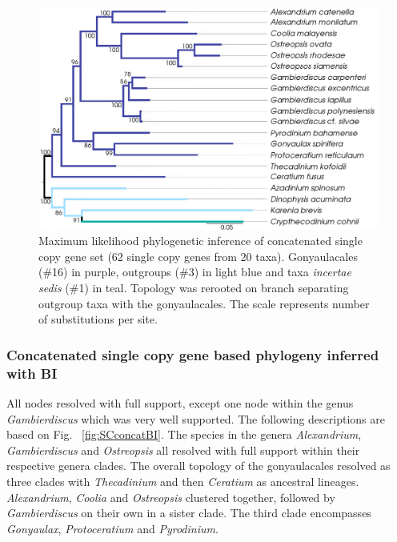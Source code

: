 \documentclass[12pt]{article}
\begin{document}
\begin{figure} 
\includegraphics[scale=.45]{figures/SC-concat-ML_WAG.png} 
\caption{Maximum likelihood phylogenetic inference of concatenated single copy gene set (62 single copy genes from 20 taxa). Gonyaulacales (\#16) in purple, outgroups (\#3) in light blue and taxa \textit{incertae sedis} (\#1) in teal. Topology was rerooted on branch separating outgroup taxa with the gonyaulacales. The scale represents number of substitutions per site.} 
\label{fig:SCconcatML}
\end{figure} 
\FloatBarrier

\subsubsection*{Concatenated single copy gene based phylogeny inferred with BI}
\FloatBarrier 
All nodes resolved with full support, except one node within the genus \textit{Gambierdiscus} which was very well supported. 
The following descriptions are based on Fig. ~\ref{fig:SCconcatBI}. 
The species in the genera \textit{Alexandrium}, \textit{Gambierdiscus} and \textit{Ostreopsis} all resolved with full support within their respective genera clades. 
The overall topology of the gonyaulacales resolved as three clades with \textit{Thecadinium} and then \textit{Ceratium} as ancestral lineages. 
\textit{Alexandrium}, \textit{Coolia} and \textit{Ostreopsis} clustered together, followed by \textit{Gambierdiscus} on their own in a sister clade. 
The third clade encompasses \textit{Gonyaulax}, \textit{Protoceratium} and \textit{Pyrodinium}. 
\end{document}
